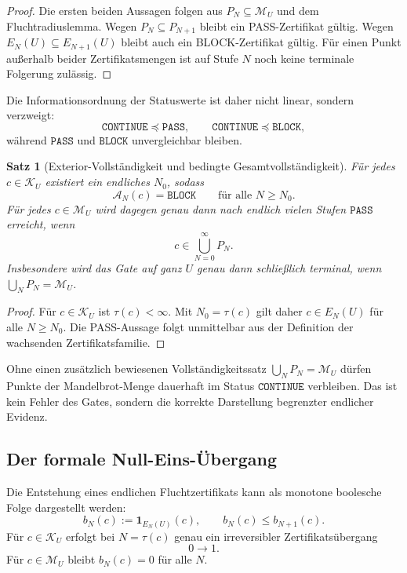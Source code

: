 \documentclass[11pt,a4paper]{article}
\newtheorem{satz}{Satz}[section]
\theoremstyle{remark}
\newcommand{\M}{\mathcal{M}}
\newcommand{\K}{\mathcal{K}}
\newcommand{\PASS}{\texttt{PASS}}
\newcommand{\CONTINUE}{\texttt{CONTINUE}}
\newcommand{\BLOCK}{\texttt{BLOCK}}
\begin{document}
\begin{proof}
Die ersten beiden Aussagen folgen aus \(P_N\subseteq\M_U\) und dem
Fluchtradiuslemma. Wegen \(P_N\subseteq P_{N+1}\) bleibt ein
PASS-Zertifikat gültig. Wegen \(E_N(U)\subseteq E_{N+1}(U)\) bleibt auch
ein BLOCK-Zertifikat gültig. Für einen Punkt außerhalb beider
Zertifikatsmengen ist auf Stufe \(N\) noch keine terminale Folgerung zulässig.
\end{proof}

Die Informationsordnung der Statuswerte ist daher nicht linear, sondern
verzweigt:
\[
  \CONTINUE\preccurlyeq\PASS,
  \qquad
  \CONTINUE\preccurlyeq\BLOCK,
\]
während \(\PASS\) und \(\BLOCK\) unvergleichbar bleiben.

\begin{satz}[Exterior-Vollständigkeit und bedingte Gesamtvollständigkeit]
\label{satz:gate-vollstaendigkeit}
Für jedes \(c\in\K_U\) existiert ein endliches \(N_0\), sodass
\[
  \mathcal A_N(c)=\BLOCK
  \qquad\text{für alle }N\ge N_0.
\]
Für jedes \(c\in\M_U\) wird dagegen genau dann nach endlich vielen Stufen
\(\PASS\) erreicht, wenn
\[
  c\in\bigcup_{N=0}^{\infty}P_N.
\]
Insbesondere wird das Gate auf ganz \(U\) genau dann schließlich terminal,
wenn \(\bigcup_NP_N=\M_U\).
\end{satz}

\begin{proof}
Für \(c\in\K_U\) ist \(\tau(c)<\infty\). Mit \(N_0=\tau(c)\) gilt daher
\(c\in E_N(U)\) für alle \(N\ge N_0\). Die PASS-Aussage folgt unmittelbar
aus der Definition der wachsenden Zertifikatsfamilie.
\end{proof}

Ohne einen zusätzlich bewiesenen Vollständigkeitssatz
\(\bigcup_NP_N=\M_U\) dürfen Punkte der Mandelbrot-Menge dauerhaft im Status
\(\CONTINUE\) verbleiben. Das ist kein Fehler des Gates, sondern die
korrekte Darstellung begrenzter endlicher Evidenz.

\subsection{Der formale Null-Eins-Übergang}

Die Entstehung eines endlichen Fluchtzertifikats kann als monotone boolesche
Folge dargestellt werden:
\[
  b_N(c):=\mathbf 1_{E_N(U)}(c),
  \qquad b_N(c)\le b_{N+1}(c).
\]
Für \(c\in\K_U\) erfolgt bei \(N=\tau(c)\) genau ein irreversibler
Zertifikatsübergang
\[
  0\longrightarrow1.
\]
Für \(c\in\M_U\) bleibt \(b_N(c)=0\) für alle \(N\).
\end{document}
